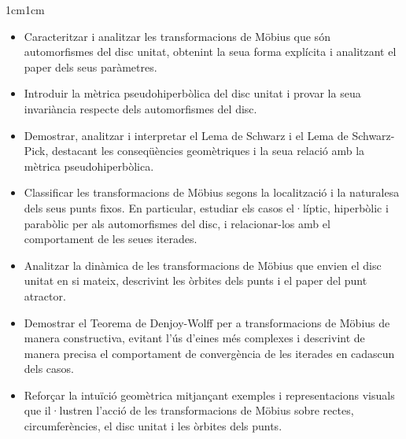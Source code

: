 \begin{adjustwidth}{1cm}{1cm}
\begin{itemize}
\item Caracteritzar i analitzar les transformacions de Möbius que són automorfismes del disc unitat, obtenint la seua forma explícita i analitzant el paper dels seus paràmetres.

\item Introduir la mètrica pseudohiperbòlica del disc unitat i provar la seua invariància respecte dels automorfismes del disc.

\item Demostrar, analitzar i interpretar el Lema de Schwarz i el Lema de Schwarz-Pick, destacant les conseqüències geomètriques i la seua relació amb la mètrica pseudohiperbòlica.

\item Classificar les transformacions de Möbius segons la localització i la naturalesa dels seus punts fixos. En particular, estudiar els casos el·líptic, hiperbòlic i parabòlic per als automorfismes del disc, i relacionar-los amb el comportament de les seues iterades.

\item Analitzar la dinàmica de les transformacions de Möbius que envien el disc unitat en si mateix, descrivint les òrbites dels punts i el paper del punt atractor.

\item Demostrar el Teorema de Denjoy-Wolff per a transformacions de Möbius de manera constructiva, evitant l'ús d'eines més complexes i descrivint de manera precisa el comportament de convergència de les iterades en cadascun dels casos.

\item Reforçar la intuïció geomètrica mitjançant exemples i representacions visuals que il·lustren l'acció de les transformacions de Möbius sobre rectes, circumferències, el disc unitat i les òrbites dels punts.

\end{itemize}

\end{adjustwidth}